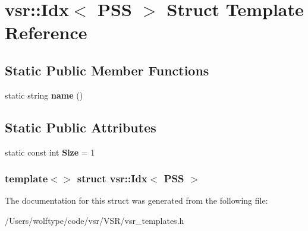 \hypertarget{structvsr_1_1_idx_3_01_p_s_s_01_4}{\section{vsr\-:\-:Idx$<$ P\-S\-S $>$ Struct Template Reference}
\label{structvsr_1_1_idx_3_01_p_s_s_01_4}
}
\subsection*{Static Public Member Functions}
\begin{DoxyCompactItemize}
\item 
\hypertarget{structvsr_1_1_idx_3_01_p_s_s_01_4_ae6df0878bbfb0de099eb282fba8d9b78}{static string {\bfseries name} ()}\label{structvsr_1_1_idx_3_01_p_s_s_01_4_ae6df0878bbfb0de099eb282fba8d9b78}

\end{DoxyCompactItemize}
\subsection*{Static Public Attributes}
\begin{DoxyCompactItemize}
\item 
\hypertarget{structvsr_1_1_idx_3_01_p_s_s_01_4_aed2ab2337d72227a3b1c69c8d2557edf}{static const int {\bfseries Size} = 1}\label{structvsr_1_1_idx_3_01_p_s_s_01_4_aed2ab2337d72227a3b1c69c8d2557edf}

\end{DoxyCompactItemize}
\subsubsection*{template$<$$>$ struct vsr\-::\-Idx$<$ P\-S\-S $>$}



The documentation for this struct was generated from the following file\-:\begin{DoxyCompactItemize}
\item 
/\-Users/wolftype/code/vsr/\-V\-S\-R/vsr\-\_\-templates.\-h\end{DoxyCompactItemize}
